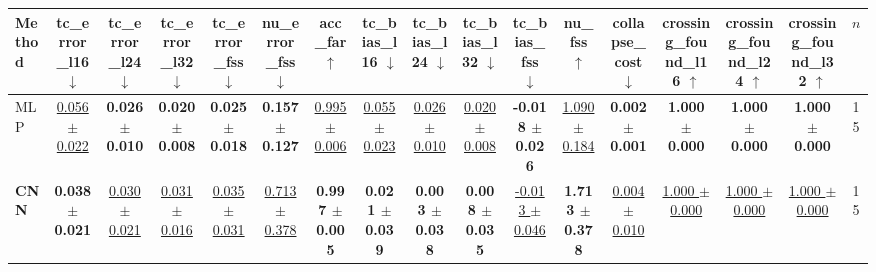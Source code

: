 \begin{tabular}{lcccccccccccccccc}
\toprule
Method & tc\_error\_l16 $\downarrow$ & tc\_error\_l24 $\downarrow$ & tc\_error\_l32 $\downarrow$ & tc\_error\_fss $\downarrow$ & nu\_error\_fss $\downarrow$ & acc\_far $\uparrow$ & tc\_bias\_l16 $\downarrow$ & tc\_bias\_l24 $\downarrow$ & tc\_bias\_l32 $\downarrow$ & tc\_bias\_fss $\downarrow$ & nu\_fss $\uparrow$ & collapse\_cost $\downarrow$ & crossing\_found\_l16 $\uparrow$ & crossing\_found\_l24 $\uparrow$ & crossing\_found\_l32 $\uparrow$ & $n$ \\
\midrule
MLP & \underline{0.056 $\pm$ 0.022} & \textbf{0.026 $\pm$ 0.010} & \textbf{0.020 $\pm$ 0.008} & \textbf{0.025 $\pm$ 0.018} & \textbf{0.157 $\pm$ 0.127} & \underline{0.995 $\pm$ 0.006} & \underline{0.055 $\pm$ 0.023} & \underline{0.026 $\pm$ 0.010} & \underline{0.020 $\pm$ 0.008} & \textbf{-0.018 $\pm$ 0.026} & \underline{1.090 $\pm$ 0.184} & \textbf{0.002 $\pm$ 0.001} & \textbf{1.000 $\pm$ 0.000} & \textbf{1.000 $\pm$ 0.000} & \textbf{1.000 $\pm$ 0.000} & 15 \\
\textbf{CNN} & \textbf{0.038 $\pm$ 0.021} & \underline{0.030 $\pm$ 0.021} & \underline{0.031 $\pm$ 0.016} & \underline{0.035 $\pm$ 0.031} & \underline{0.713 $\pm$ 0.378} & \textbf{0.997 $\pm$ 0.005} & \textbf{0.021 $\pm$ 0.039} & \textbf{0.003 $\pm$ 0.038} & \textbf{0.008 $\pm$ 0.035} & \underline{-0.013 $\pm$ 0.046} & \textbf{1.713 $\pm$ 0.378} & \underline{0.004 $\pm$ 0.010} & \underline{1.000 $\pm$ 0.000} & \underline{1.000 $\pm$ 0.000} & \underline{1.000 $\pm$ 0.000} & 15 \\
\bottomrule
\end{tabular}
